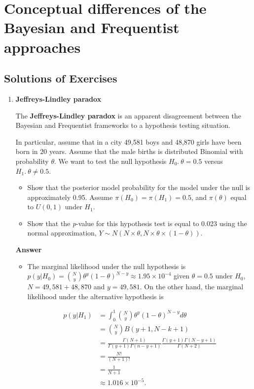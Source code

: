 \chapter{Conceptual differences of the Bayesian and Frequentist approaches}\label{chap2}
\section*{Solutions of Exercises}\label{sec21}
\begin{enumerate}[leftmargin=*]
\item \textbf{Jeffreys-Lindley paradox}

The \textbf{Jeffreys-Lindley paradox} \cite{Jeffreys1961,lindley1957statistical} is an apparent disagreement between the Bayesian and Frequentist frameworks to a hypothesis testing situation.

In particular, assume that in a city 49,581 boys and 48,870 girls have been born in 20 years. Assume that the male births is distributed Binomial with probability $\theta$. We want to test the null hypothesis $H_0. \ \theta=0.5$ versus $H_1. \ \theta\neq 0.5$.

\begin{itemize}
	\item Show that the posterior model probability for the model under the null is approximately 0.95. Assume $\pi(H_0)=\pi(H_1)=0.5$, and $\pi(\theta)$ equal to ${U}(0,1)$ under $H_1$.
	\item Show that the \textit{p}-value for this hypothesis test is equal to 0.023 using the normal approximation, $Y\sim {N}(N\times \theta, N\times \theta \times (1-\theta))$. 
\end{itemize}

\textbf{Answer}

\begin{itemize}
	\item The marginal likelihood under the null hypothesis is $p(y|H_0)={N \choose y}\theta^y(1-\theta)^{N-y}\approx 1.95\times 10^{-4}$ given $\theta=0.5$ under $H_0$, $N=49,581+48,870$ and $y=49,581$. On the other hand, the marginal likelihood under the alternative hypothesis is

\begin{align*}
	p(y|H_1)&=\int_{0}^{1}{N \choose y}\theta^y(1-\theta)^{N-y}d\theta\\
	&={N \choose y} B(y+1, N-k+1)\\
	&=\frac{\Gamma(N+1)}{\Gamma(y+1)\Gamma(n-y+1)}\frac{\Gamma(y+1)\Gamma(N-y+1)}{\Gamma(N+2)}\\
	&=\frac{N!}{(N+1)!}\\
	&=\frac{1}{N+1}\\
	&\approx1.016\times 10^{-5}. 
\end{align*}


\end{itemize}
\end{enumerate}
